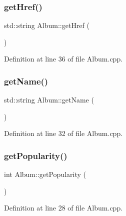 \mbox{\label{class_album_ad52a5f5ca62fed1cd4e7f2636dc719cc}} 
\subsubsection{\texorpdfstring{get\+Href()}{getHref()}}
{\footnotesize\ttfamily std\+::string Album\+::get\+Href (\begin{DoxyParamCaption}{ }\end{DoxyParamCaption})}



Definition at line 36 of file Album.\+cpp.

\mbox{\label{class_album_ab2b116edc307d99e6e3fe04b70b931da}} 
\subsubsection{\texorpdfstring{get\+Name()}{getName()}}
{\footnotesize\ttfamily std\+::string Album\+::get\+Name (\begin{DoxyParamCaption}{ }\end{DoxyParamCaption})}



Definition at line 32 of file Album.\+cpp.

\mbox{\label{class_album_abc27e8ac3854cd3404edc90ce7b92ef1}} 
\subsubsection{\texorpdfstring{get\+Popularity()}{getPopularity()}}
{\footnotesize\ttfamily int Album\+::get\+Popularity (\begin{DoxyParamCaption}{ }\end{DoxyParamCaption})}



Definition at line 28 of file Album.\+cpp.

\mbox{\label{class_album_a04b6a6e333e7f78321fb7bffaf968dfa}} 
